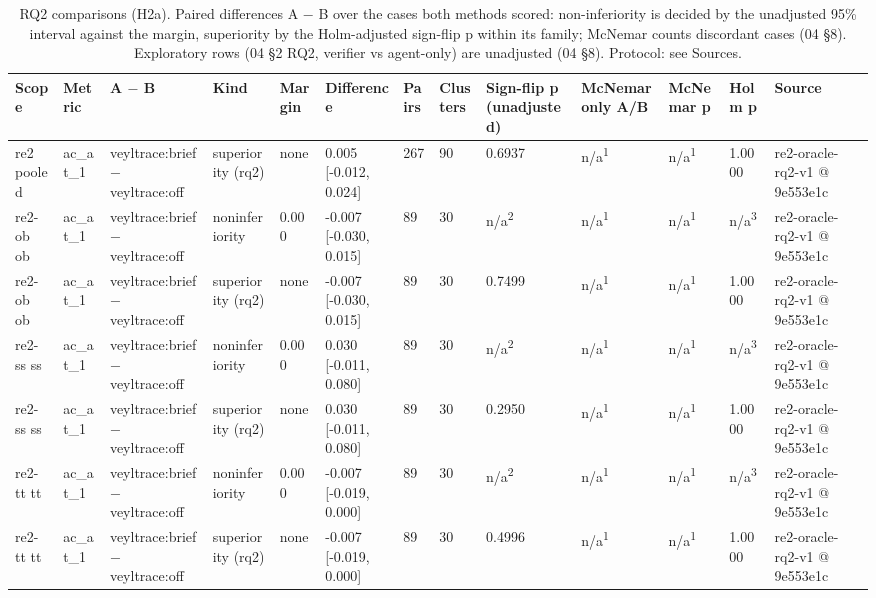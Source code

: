\begin{table}[t]
\centering
\caption{RQ2 comparisons (H2a). Paired differences A $-$ B over the cases both methods scored: non-inferiority is decided by the unadjusted 95\% interval against the margin, superiority by the Holm-adjusted sign-flip p within its family; McNemar counts discordant cases (04 \S{}8). Exploratory rows (04 \S{}2 RQ2, verifier vs agent-only) are unadjusted (04 \S{}8). Protocol: see Sources.}
\label{tab:t06c-rq2-comparisons}
\small
\begin{tabular}{lllllllllllll}
\hline
Scope & Metric & A $-$ B & Kind & Margin & Difference & Pairs & Clusters & Sign-flip p (unadjusted) & McNemar only A/B & McNemar p & Holm p & Source \\
\hline
re2 pooled & ac\_at\_1 & veyltrace:brief $-$ veyltrace:off & superiority (rq2) & none & 0.005 [-0.012, 0.024] & 267 & 90 & 0.6937 & n/a\textsuperscript{1} & n/a\textsuperscript{1} & 1.0000 & re2-oracle-rq2-v1 @ 9e553e1c \\
re2-ob ob & ac\_at\_1 & veyltrace:brief $-$ veyltrace:off & noninferiority & 0.000 & -0.007 [-0.030, 0.015] & 89 & 30 & n/a\textsuperscript{2} & n/a\textsuperscript{1} & n/a\textsuperscript{1} & n/a\textsuperscript{3} & re2-oracle-rq2-v1 @ 9e553e1c \\
re2-ob ob & ac\_at\_1 & veyltrace:brief $-$ veyltrace:off & superiority (rq2) & none & -0.007 [-0.030, 0.015] & 89 & 30 & 0.7499 & n/a\textsuperscript{1} & n/a\textsuperscript{1} & 1.0000 & re2-oracle-rq2-v1 @ 9e553e1c \\
re2-ss ss & ac\_at\_1 & veyltrace:brief $-$ veyltrace:off & noninferiority & 0.000 & 0.030 [-0.011, 0.080] & 89 & 30 & n/a\textsuperscript{2} & n/a\textsuperscript{1} & n/a\textsuperscript{1} & n/a\textsuperscript{3} & re2-oracle-rq2-v1 @ 9e553e1c \\
re2-ss ss & ac\_at\_1 & veyltrace:brief $-$ veyltrace:off & superiority (rq2) & none & 0.030 [-0.011, 0.080] & 89 & 30 & 0.2950 & n/a\textsuperscript{1} & n/a\textsuperscript{1} & 1.0000 & re2-oracle-rq2-v1 @ 9e553e1c \\
re2-tt tt & ac\_at\_1 & veyltrace:brief $-$ veyltrace:off & noninferiority & 0.000 & -0.007 [-0.019, 0.000] & 89 & 30 & n/a\textsuperscript{2} & n/a\textsuperscript{1} & n/a\textsuperscript{1} & n/a\textsuperscript{3} & re2-oracle-rq2-v1 @ 9e553e1c \\
re2-tt tt & ac\_at\_1 & veyltrace:brief $-$ veyltrace:off & superiority (rq2) & none & -0.007 [-0.019, 0.000] & 89 & 30 & 0.4996 & n/a\textsuperscript{1} & n/a\textsuperscript{1} & 1.0000 & re2-oracle-rq2-v1 @ 9e553e1c \\

\end{tabular}
\end{table}
